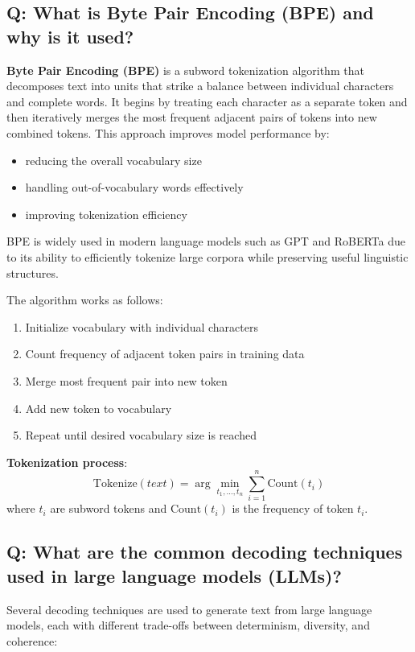 \subsection*{Q: What is Byte Pair Encoding (BPE) and why is it used?}
\textbf{Byte Pair Encoding (BPE)} is a subword tokenization algorithm that decomposes text into units that strike a balance between individual characters and complete words. It begins by treating each character as a separate token and then iteratively merges the most frequent adjacent pairs of tokens into new combined tokens. This approach improves model performance by:
\begin{itemize}
	\item reducing the overall vocabulary size
	\item handling out-of-vocabulary words effectively
	\item improving tokenization efficiency
\end{itemize}

BPE is widely used in modern language models such as GPT and RoBERTa due to its ability to efficiently tokenize large corpora while preserving useful linguistic structures.

The algorithm works as follows:
\begin{enumerate}
	\item Initialize vocabulary with individual characters
	\item Count frequency of adjacent token pairs in training data
	\item Merge most frequent pair into new token
	\item Add new token to vocabulary
	\item Repeat until desired vocabulary size is reached
\end{enumerate}

\textbf{Tokenization process}:
\[
	\text{Tokenize}(text) = \arg\min_{t_1, \ldots, t_n} \sum_{i=1}^{n} \text{Count}(t_i)
\]
where \(t_i\) are subword tokens and \(\text{Count}(t_i)\) is the frequency of token \(t_i\).

\subsection*{Q: What are the common decoding techniques used in large language models (LLMs)?}
Several decoding techniques are used to generate text from large language models, each with different trade-offs between determinism, diversity, and coherence:

